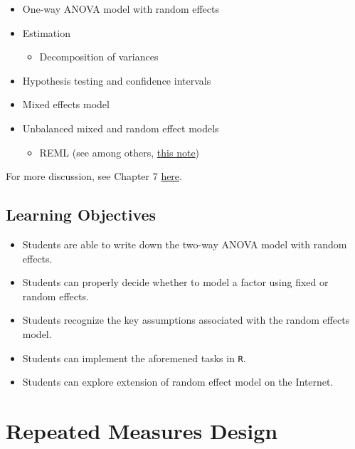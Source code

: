 \documentclass[12pt,]{book}
\providecommand{\tightlist}{%
  \setlength{\itemsep}{0pt}\setlength{\parskip}{0pt}}
\begin{document}
\begin{itemize}
\tightlist
\item
  One-way ANOVA model with random effects
\item
  Estimation

  \begin{itemize}
  \tightlist
  \item
    Decomposition of variances
  \end{itemize}
\item
  Hypothesis testing and confidence intervals
\item
  Mixed effects model
\item
  Unbalanced mixed and random effect models

  \begin{itemize}
  \tightlist
  \item
    REML (see among others,
    \href{http://www2.compute.dtu.dk/courses/02429/enotepdfs/eNote-10.pdf}{this
    note})
  \end{itemize}
\end{itemize}

For more discussion, see Chapter 7
\href{https://stat.ethz.ch/~meier/teaching/anova/random-and-mixed-effects-models.html}{here}.

\section{Learning Objectives}\label{learning-objectives-3}

\begin{itemize}
\tightlist
\item
  Students are able to write down the two-way ANOVA model with random
  effects.
\item
  Students can properly decide whether to model a factor using fixed or
  random effects.
\item
  Students recognize the key assumptions associated with the random
  effects model.
\item
  Students can implement the aforemened tasks in \texttt{R}.
\item
  Students can explore extension of random effect model on the Internet.
\end{itemize}

\chapter{Repeated Measures Design}\label{ch:repeated}
\end{document}
